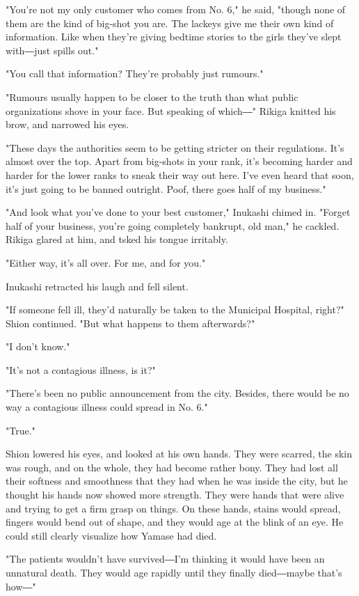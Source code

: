 "You're not my only customer who comes from No. 6," he said, "though
none of them are the kind of big-shot you are. The lackeys give me their
own kind of information. Like when they're giving bedtime stories to the
girls they've slept with―just spills out."

"You call that information? They're probably just rumours."

"Rumours usually happen to be closer to the truth than what public
organizations shove in your face. But speaking of which―" Rikiga knitted
his brow, and narrowed his eyes.

"These days the authorities seem to be getting stricter on their
regulations. It's almost over the top. Apart from big-shots in your
rank, it's becoming harder and harder for the lower ranks to sneak their
way out here. I've even heard that soon, it's just going to be banned
outright. Poof, there goes half of my business."

"And look what you've done to your best customer," Inukashi chimed in.
"Forget half of your business, you're going completely bankrupt, old
man," he cackled. Rikiga glared at him, and tsked his tongue irritably.

"Either way, it's all over. For me, and for you."

Inukashi retracted his laugh and fell silent.

"If someone fell ill, they'd naturally be taken to the Municipal
Hospital, right?" Shion continued. "But what happens to them
afterwards?"

"I don't know."

"It's not a contagious illness, is it?"

"There's been no public announcement from the city. Besides, there would
be no way a contagious illness could spread in No. 6."

"True."

Shion lowered his eyes, and looked at his own hands. They were scarred,
the skin was rough, and on the whole, they had become rather bony. They
had lost all their softness and smoothness that they had when he was
inside the city, but he thought his hands now showed more strength. They
were hands that were alive and trying to get a firm grasp on things. On
these hands, stains would spread, fingers would bend out of shape, and
they would age at the blink of an eye. He could still clearly visualize
how Yamase had died.

"The patients wouldn't have survived―I'm thinking it would have been an
unnatural death. They would age rapidly until they finally died―maybe
that's how―"

